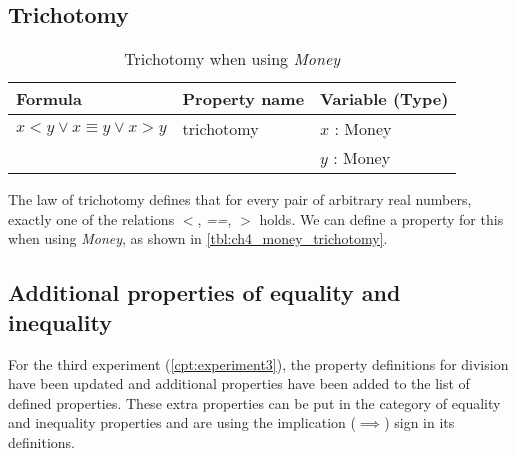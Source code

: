 \subsection*{Trichotomy}
\label{ssct:properties_trichotomy}
\begin{table}[!ht]
\centering
\begin{tabular}{lll}
\hline
                        \textbf{Formula}                   & \textbf{Property name} & \textbf{Variable (Type)} \\ \hline
\rowcolor[HTML]{EFEFEF} $x < y \lor x \equiv y \lor x > y$ & trichotomy             & $x$ : Money              \\
\rowcolor[HTML]{EFEFEF}                                    &                        & $y$ : Money              \\ \hline
\end{tabular}
\caption{Trichotomy when using \textit{Money}}
\label{tbl:ch4_money_trichotomy}
\end{table}
\FloatBarrier\noindent
The law of trichotomy defines that for every pair of arbitrary real numbers,
exactly one of the relations \textit{$<$}, \textit{==}, \textit{$>$} holds. We
can define a property for this when using \textit{Money}, as shown in
\autoref{tbl:ch4_money_trichotomy}.

\subsection{Additional properties of equality and inequality}
\label{ssct:properties_definitions_additionalproperties}
For the third experiment (\autoref{cpt:experiment3}), the property definitions for division have been updated and additional properties have
been added to the list of defined properties. These extra properties can be put in the category of equality and
inequality properties and are using the implication ($\implies$) sign in its
definitions.

